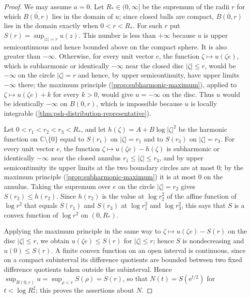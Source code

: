 \begin{proof}
We may assume $a=0$. Let $R_*\in(0,\infty]$ be the supremum of the radii $r$ for which $\overline{B(0,r)}$ lies in the domain of $u$; since closed balls are compact, $\overline{B(0,r)}$ lies in the domain exactly when $0<r<R_*$. For such $r$ put $S(r)=\sup_{|z|=r}u(z)$. This number is less than $+\infty$ because $u$ is upper semicontinuous and hence bounded above on the compact sphere. It is also greater than $-\infty$. Otherwise, for every unit vector $e$, the function $\zeta\mapsto u(\zeta e)$, which is subharmonic or identically $-\infty$ near the closed disc $|\zeta|\leq r$, would be $-\infty$ on the circle $|\zeta|=r$ and hence, by upper semicontinuity, have upper limits $-\infty$ there; the maximum principle (\cref{prop:subharmonic-maximum}), applied to $\zeta\mapsto u(\zeta e)+k$ for every $k>0$, would give $u=-\infty$ on the disc. Thus $u$ would be identically $-\infty$ on $B(0,r)$, which is impossible because $u$ is locally integrable (\cref{thm:psh-distribution-representative}).

Let $0<r_1<r_2<r_3<R_*$, and let $h(\zeta)=A+B\log|\zeta|^2$ be the harmonic function on $\mathbb C\setminus\{0\}$ equal to $S(r_1)$ on $|\zeta|=r_1$ and to $S(r_3)$ on $|\zeta|=r_3$. For every unit vector $e$, the function $\zeta\mapsto u(\zeta e)-h(\zeta)$ is subharmonic or identically $-\infty$ near the closed annulus $r_1\leq|\zeta|\leq r_3$, and by upper semicontinuity its upper limits at the two boundary circles are at most $0$; by the maximum principle (\cref{prop:subharmonic-maximum}) it is at most $0$ on the annulus. Taking the supremum over $e$ on the circle $|\zeta|=r_2$ gives $S(r_2)\leq h(r_2)$. Since $h(r_2)$ is the value at $\log r_2^2$ of the affine function of $\log r^2$ that equals $S(r_1)$ and $S(r_3)$ at $\log r_1^2$ and $\log r_3^2$, this says that $S$ is a convex function of $\log r^2$ on $(0,R_*)$.

Applying the maximum principle in the same way to $\zeta\mapsto u(\zeta e)-S(r)$ on the disc $|\zeta|\leq r$, we obtain $u(\zeta e)\leq S(r)$ for $|\zeta|\leq r$; hence $S$ is nondecreasing and $u(0)\leq S(r)$. A finite convex function on an open interval is continuous, since on a compact subinterval its difference quotients are bounded between two fixed difference quotients taken outside the subinterval. Hence $\sup_{B(0,r)}u=\sup_{\rho<r}S(\rho)=S(r)$, so that $N(t)=S(\mathrm e^{t/2})$ for $t<\log R_*^2$; this proves the assertions about $N$.


\end{proof}
